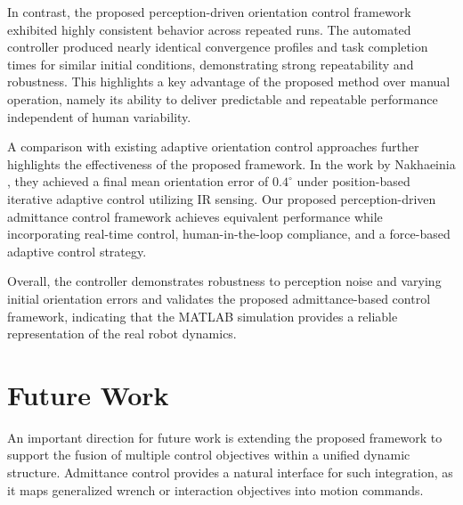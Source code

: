 \documentclass[journal]{IEEEtran}
\begin{document}
In contrast, the proposed perception-driven orientation control framework exhibited highly consistent behavior across repeated runs. The automated controller produced nearly identical convergence profiles and task completion times for similar initial conditions, demonstrating strong repeatability and robustness. This highlights a key advantage of the proposed method over manual operation, namely its ability to deliver predictable and repeatable performance independent of human variability.

A comparison with existing adaptive orientation control approaches further highlights the effectiveness of the proposed framework. In the work by Nakhaeinia \cite{nakhaeinia2018hybrid}, they achieved a final mean orientation error of $0.4^\circ$ under position-based iterative adaptive control utilizing IR sensing. Our proposed perception-driven admittance control framework achieves equivalent performance while incorporating real-time control, human-in-the-loop compliance, and a force-based adaptive control strategy.

 
 
Overall, the controller demonstrates robustness to perception noise and varying initial orientation errors and validates the proposed admittance-based control framework, indicating that the MATLAB simulation provides a reliable representation of the real robot dynamics.


\section{Future Work}
\label{sec:future}

An important direction for future work is extending the proposed framework to support the fusion of multiple control objectives within a unified dynamic structure. Admittance control provides a natural interface for such integration, as it maps generalized wrench or interaction objectives into motion commands.
\end{document}
